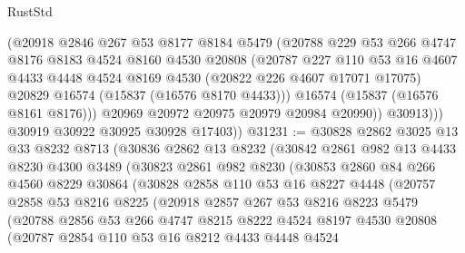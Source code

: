\begin{lexlean}{RustStd}
\begin{coremodule}
{\begin{coremodule}
{{{{{{{{{{{{{{{{{{{{{{{{{{{{{{{{{{{{{{{{{{{{{{{{{{{{{{{{{{{{                (@20918
                  @2846
                  @267
                  @53
                  @8177
                  @8184
                  @5479
                  (@20788
                    @229
                    @53
                    @266
                    @4747
                    @8176
                    @8183
                    @4524
                    @8160
                    @4530
                    @20808
                    (@20787
                      @227
                      @110
                      @53
                      @16
                      @4607
                      @4433
                      @4448
                      @4524
                      @8169
                      @4530
                      (@20822 @226 @4607 @17071 @17075)
                      @20829
                      @16574
                      (@15837 (@16576 @8170 @4433)))
                    @16574
                    (@15837 (@16576 @8161 @8176)))
                  @20969
                  @20972
                  @20975
                  @20979
                  @20984
                  @20990))
              @30913)))
        @30919
        @30922
        @30925
        @30928
        @17403))
@31231 := @30828
    @2862
    @3025
    @13
    @33
    @8232
    @8713
    (@30836
      @2862
      @13
      @8232
      (@30842
        @2861
        @982
        @13
        @4433
        @8230
        @4300
        @3489
        (@30823
          @2861
          @982
          @8230
          (@30853
            @2860
            @84
            @266
            @4560
            @8229
            @30864
            (@30828
              @2858
              @110
              @53
              @16
              @8227
              @4448
              (@20757
                @2858
                @53
                @8216
                @8225
                (@20918
                  @2857
                  @267
                  @53
                  @8216
                  @8223
                  @5479
                  (@20788
                    @2856
                    @53
                    @266
                    @4747
                    @8215
                    @8222
                    @4524
                    @8197
                    @4530
                    @20808
                    (@20787
                      @2854
                      @110
                      @53
                      @16
                      @8212
                      @4433
                      @4448
                      @4524
}}}}}}}}}}}}}}}}}}}}}}}}}}}}}}}}}}}}}}}}}}}}}}}}}}}}}}}}}}}}
\end{coremodule}}
\end{coremodule}
\end{lexlean}
